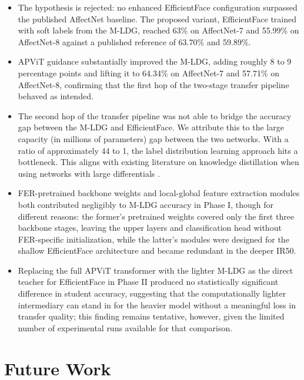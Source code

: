 \begin{itemize}
	\item The hypothesis is rejected: no enhanced EfficientFace configuration surpassed the published AffectNet baseline. The proposed variant, EfficientFace trained with soft labels from the M-LDG, reached 63\% on AffectNet-7 and 55.99\% on AffectNet-8 against a published reference of 63.70\% and 59.89\%.

	\item APViT guidance substantially improved the M-LDG, adding roughly 8 to 9 percentage points and lifting it to 64.34\% on AffectNet-7 and 57.71\% on AffectNet-8, confirming that the first hop of the two-stage transfer pipeline behaved as intended.

	\item The second hop of the transfer pipeline was not able to bridge the accuracy gap between the M-LDG and EfficientFace. We attribute this to the large capacity (in millions of parameters) gap between the two networks. With a ratio of approximately 44 to 1, the label distribution learning approach hits a bottleneck. This aligns with existing literature on knowledge distillation when using networks with large differentials \cite{mirzadeh2020takd}.

	\item FER-pretrained backbone weights and local-global feature extraction modules both contributed negligibly to M-LDG accuracy in Phase I, though for different reasons: the former's pretrained weights covered only the first three backbone stages, leaving the upper layers and classification head without FER-specific initialization, while the latter's modules were designed for the shallow EfficientFace architecture and became redundant in the deeper IR50.

	\item Replacing the full APViT transformer with the lighter M-LDG as the direct teacher for EfficientFace in Phase II produced no statistically significant difference in student accuracy, suggesting that the computationally lighter intermediary can stand in for the heavier model without a meaningful loss in transfer quality; this finding remains tentative, however, given the limited number of experimental runs available for that comparison.
\end{itemize}


\section{Future Work}

